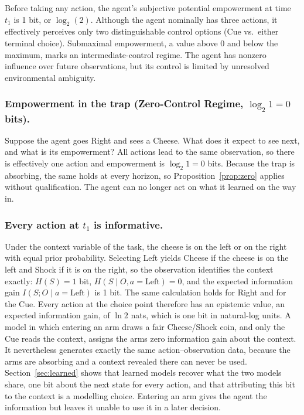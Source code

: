 \documentclass[letterpaper]{article} %
\theoremstyle{definition}
\begin{document}
Before taking any action, the agent's subjective potential empowerment at time $t_1$ is 1 bit, or $\log_2(2)$. Although the agent nominally has three actions, it effectively perceives only two distinguishable control options (Cue vs.\ either terminal choice). Submaximal empowerment, a value above 0 and below the maximum, marks an intermediate-control regime. The agent has nonzero influence over future observations, but its control is limited by unresolved environmental ambiguity.

\subsubsection{Empowerment in the trap (Zero-Control Regime, $\log_2 1 = 0$ bits).}
Suppose the agent goes Right and sees a Cheese. What does it expect to see next, and what is its empowerment? All actions lead to the same observation, so there is effectively one action and empowerment is $\log_2 1 = 0$ bits. Because the trap is absorbing, the same holds at every horizon, so Proposition~\ref{prop:zero} applies without qualification. The agent can no longer act on what it learned on the way in.

\subsubsection{Every action at $t_1$ is informative.}\label{sec:efe}
Under the context variable of the task, the cheese is on the left or on the right with equal prior probability. Selecting Left yields Cheese if the cheese is on the left and Shock if it is on the right, so the observation identifies the context exactly: $H(S) = 1$ bit, $H(S \mid O, a = \text{Left}) = 0$, and the expected information gain $I(S; O \mid a = \text{Left})$ is 1 bit. The same calculation holds for Right and for the Cue. Every action at the choice point therefore has an epistemic value, an expected information gain, of $\ln 2$ nats, which is one bit in natural-log units. A model in which entering an arm draws a fair Cheese/Shock coin, and only the Cue reads the context, assigns the arms zero information gain about the context. It nevertheless generates exactly the same action--observation data, because the arms are absorbing and a context revealed there can never be used. Section~\ref{sec:learned} shows that learned models recover what the two models share, one bit about the next state for every action, and that attributing this bit to the context is a modelling choice. Entering an arm gives the agent the information but leaves it unable to use it in a later decision.
\end{document}
